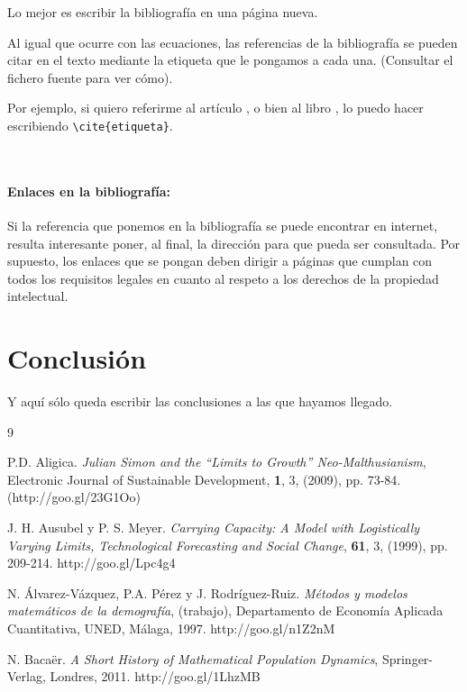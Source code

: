 \documentclass[a4paper,12pt]{article}
\begin{document}
{Lo mejor es escribir la bibliografía en una página nueva.

Al igual que ocurre con las ecuaciones, las referencias de la bibliografía se pueden citar en el texto mediante la etiqueta que le pongamos a cada una. (Consultar el fichero fuente para ver cómo).

Por ejemplo, si quiero referirme al artículo \cite{ausubel}, o bien al libro \cite{bacaer}, lo puedo hacer escribiendo \verb|\cite{etiqueta}|.

\

\paragraph{Enlaces en la bibliografía:} Si la referencia que ponemos en la bibliografía se puede encontrar en internet, resulta interesante poner, al final, la dirección para que pueda ser consultada. Por supuesto, los enlaces que se pongan deben dirigir a páginas que cumplan con todos los requisitos legales en cuanto al respeto a los derechos de la propiedad intelectual.

\section{Conclusión}
Y aquí sólo queda escribir las conclusiones a las que hayamos llegado.


\newpage

\renewcommand\refname{Bibliografía}

\begin{thebibliography}{9}

 P.D. Aligica. \textsl{Julian Simon and the “Limits to Growth” Neo-Malthusianism}, Electronic Journal of Sustainable Development, \textbf{1}, 3, (2009), pp. 73-84. (http://goo.gl/23G1Oo)

 J. H. Ausubel y P. S. Meyer. \textsl{Carrying Capacity: A Model with
Logistically Varying Limits, Technological Forecasting and Social Change},
\textbf{61}, 3, (1999), pp. 209-214. http://goo.gl/Lpc4g4

 N. Álvarez-Vázquez, P.A. Pérez y J. Rodríguez-Ruiz. \textsl{Métodos y
modelos matemáticos de la demografía}, (trabajo), Departamento de Economía
Aplicada Cuantitativa, UNED, Málaga, 1997. http://goo.gl/n1Z2nM

 N. Bacaër. \textsl{A Short History of Mathematical Population Dynamics},
Springer-Verlag, Londres, 2011. http://goo.gl/1LhzMB


\end{thebibliography}}
\end{document}
